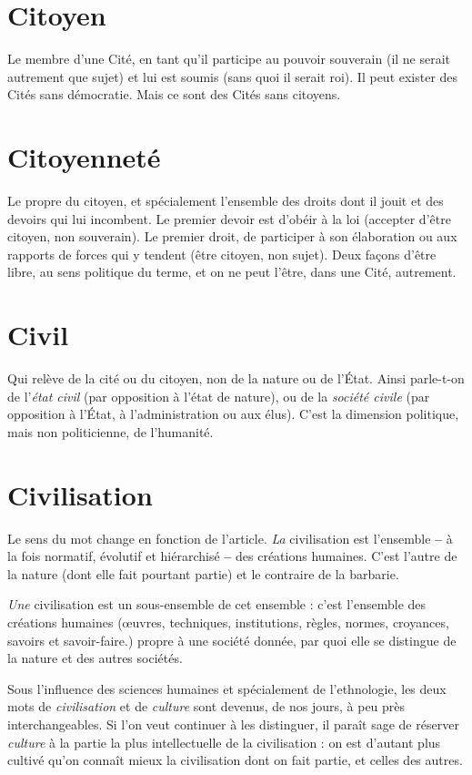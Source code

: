 \section{Citoyen}
Le membre d’une Cité, en tant qu’il participe au pouvoir souverain
(il ne serait autrement que sujet) et lui est soumis (sans quoi
il serait roi).
Il peut exister des Cités sans démocratie. Mais ce sont des Cités sans
citoyens.

\section{Citoyenneté}
Le propre du citoyen, et spécialement l’ensemble des
droits dont il jouit et des devoirs qui lui incombent. Le
premier devoir est d’obéir à la loi (accepter d’être citoyen, non souverain). Le
premier droit, de participer à son élaboration ou aux rapports de forces qui y
tendent (être citoyen, non sujet). Deux façons d’être libre, au sens politique du
terme, et on ne peut l'être, dans une Cité, autrement.

\section{Civil}
Qui relève de la cité ou du citoyen, non de la nature ou de l’État.
Ainsi parle-t-on de l’{\it état civil} (par opposition à l’état de nature), ou
de la {\it société civile} (par opposition à l’État, à l'administration ou aux élus). C’est
la dimension politique, mais non politicienne, de l’humanité.

\section{Civilisation}
Le sens du mot change en fonction de l’article.
{\it La} civilisation est l’ensemble {\bf --} à la fois normatif, évolutif
et hiérarchisé {\bf --} des créations humaines. C’est l’autre de la nature (dont elle fait
pourtant partie) et le contraire de la barbarie.

{\it Une} civilisation est un sous-ensemble de cet ensemble : c’est l’ensemble des
créations humaines (œuvres, techniques, institutions, règles, normes, croyances,
savoirs et savoir-faire.) propre à une société donnée, par quoi elle se distingue
de la nature et des autres sociétés.

Sous l'influence des sciences humaines et spécialement de l’ethnologie, les
deux mots de {\it civilisation} et de {\it culture} sont devenus, de nos jours, à peu près
interchangeables. Si l’on veut continuer à les distinguer, il paraît sage de
réserver {\it culture} à la partie la plus intellectuelle de la civilisation : on est d’autant
plus cultivé qu’on connaît mieux la civilisation dont on fait partie, et celles des
autres.

